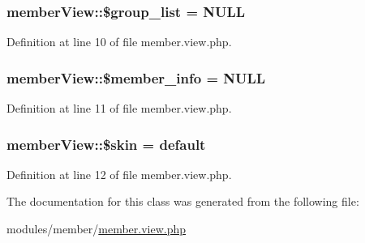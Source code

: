 \subsubsection[{\texorpdfstring{\$group\+\_\+list}{$group_list}}]{\setlength{\rightskip}{0pt plus 5cm}member\+View\+::\$group\+\_\+list = N\+U\+LL}\hypertarget{classmemberView_a8a34ae05d48f3e4471f073c7b6094a19}{}\label{classmemberView_a8a34ae05d48f3e4471f073c7b6094a19}


Definition at line 10 of file member.\+view.\+php.

\subsubsection[{\texorpdfstring{\$member\+\_\+info}{$member_info}}]{\setlength{\rightskip}{0pt plus 5cm}member\+View\+::\$member\+\_\+info = N\+U\+LL}\hypertarget{classmemberView_a435c30d8223b51ac6b6a568142dc6c2e}{}\label{classmemberView_a435c30d8223b51ac6b6a568142dc6c2e}


Definition at line 11 of file member.\+view.\+php.

\subsubsection[{\texorpdfstring{\$skin}{$skin}}]{\setlength{\rightskip}{0pt plus 5cm}member\+View\+::\$skin = \textquotesingle{}default\textquotesingle{}}\hypertarget{classmemberView_a01171d2b82e91a06754a9f8c52af6962}{}\label{classmemberView_a01171d2b82e91a06754a9f8c52af6962}


Definition at line 12 of file member.\+view.\+php.



The documentation for this class was generated from the following file\+:\begin{DoxyCompactItemize}
\item 
modules/member/\hyperlink{member_8view_8php}{member.\+view.\+php}\end{DoxyCompactItemize}
